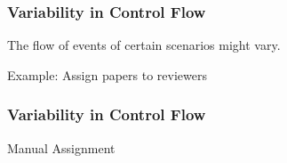 \documentclass[xcolor=svgnames]{beamer}
\begin{document}
\begin{frame}
\frametitle{Variability in Control Flow}
The flow of events of certain scenarios might vary.

\begin{block}{Example: Assign papers to reviewers}

\begin{center} 
\end{center}

\end{block}

\end{frame}

\begin{frame}
\frametitle{Variability in Control Flow}

\begin{block}{Manual Assignment}
\begin{center} 
\end{center}
\end{block}
\end{frame}
\end{document}
